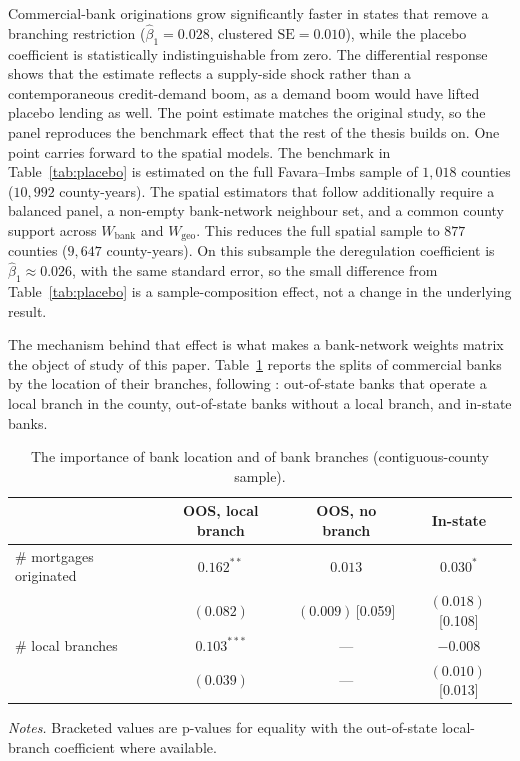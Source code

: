 Commercial-bank originations grow significantly faster in states that remove a
branching restriction ($\hat\beta_1 = 0.028$, clustered $\mathrm{SE}=0.010$),
while the placebo coefficient is statistically indistinguishable from zero. The
differential response shows that the estimate
reflects a supply-side shock rather than a contemporaneous credit-demand boom, as a
demand boom would have lifted placebo lending as well. The point estimate matches
the original study, so the panel reproduces the benchmark effect that the rest of
the thesis builds on. One point carries forward to the spatial models.
The benchmark in Table~\ref{tab:placebo} is estimated on the full Favara--Imbs
sample of $1{,}018$ counties ($10{,}992$ county-years). The spatial estimators
that follow additionally require a balanced panel, a non-empty bank-network
neighbour set, and a common county support across $W_{\text{bank}}$ and
$W_{\text{geo}}$. This reduces the full spatial sample to $877$ counties
($9{,}647$ county-years). On this subsample the deregulation coefficient is
$\hat\beta_1 \approx 0.026$, with the same standard error, so the small difference
from Table~\ref{tab:placebo} is a sample-composition effect, not a change in the
underlying result.

The mechanism behind that effect is what makes a bank-network weights matrix the object of study of this paper. Table~\ref{tab:banktype} reports the splits of commercial banks by the
location of their branches, following \cite{favara2015}: out-of-state banks
that operate a local branch in the county, out-of-state banks without a local
branch, and in-state banks.

\begin{table}[htbp]
  \centering
  \caption{The importance of bank location and of bank branches (contiguous-county sample).}
  \label{tab:banktype}
  \small
  \begin{tabular}{lccc}
    \toprule
     & OOS, local branch & OOS, no branch & In-state \\
    \midrule
    \# mortgages originated & $0.162^{**}$ & $0.013$ & $0.030^{*}$ \\
                            & $(0.082)$ & $(0.009)$\,[0.059] & $(0.018)$\,[0.108] \\
    \addlinespace
    \# local branches & $0.103^{***}$ & --- & $-0.008$ \\
                            & $(0.039)$ & --- & $(0.010)$\,[0.013] \\
    \bottomrule
  \end{tabular}
  \begin{tablenotes}\footnotesize
  \item \emph{Notes.} Bracketed values are p-values for equality with the out-of-state local-branch coefficient where available.
  \end{tablenotes}
\end{table}


